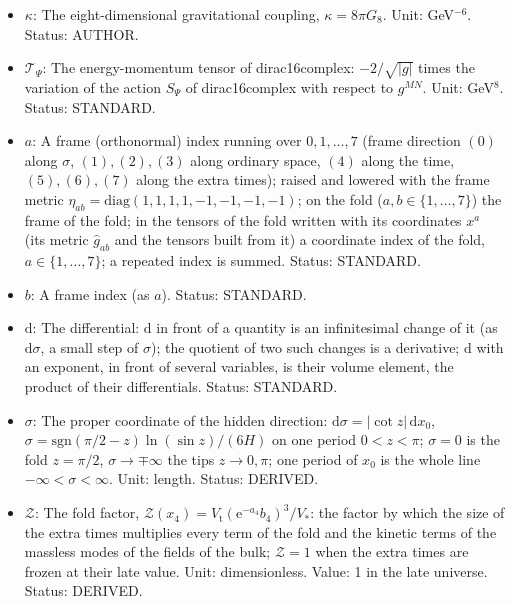 \documentclass[
  10pt,
]{article}
\providecommand{\tightlist}{%
  \setlength{\itemsep}{0pt}\setlength{\parskip}{0pt}}
\begin{document}
\begin{itemize}
\tightlist
\item
  \(\kappa\): The eight-dimensional gravitational coupling,
  \(\kappa = 8\pi G_8\). Unit: GeV\(^{-6}\). Status: AUTHOR.
\item
  \(\mathcal{T}_\Psi\): The energy-momentum tensor of dirac16complex:
  \(-2/\sqrt{\lvert g\rvert}\) times the variation of the action
  \(S_\Psi\) of dirac16complex with respect to \(g^{MN}\). Unit:
  GeV\(^8\). Status: STANDARD.
\item
  \(a\): A frame (orthonormal) index running over \(0, 1, \dots, 7\)
  (frame direction \((0)\) along \(\sigma\), \((1), (2), (3)\) along
  ordinary space, \((4)\) along the time, \((5), (6), (7)\) along the
  extra times); raised and lowered with the frame metric
  \(\eta_{ab} = \mathrm{diag}(1, 1, 1, 1, -1, -1, -1, -1)\); on the fold
  (\(a, b \in \{1, \dots, 7\}\)) the frame of the fold; in the tensors
  of the fold written with its coordinates \(x^a\) (its metric
  \(\hat g_{ab}\) and the tensors built from it) a coordinate index of
  the fold, \(a \in \{1, \dots, 7\}\); a repeated index is summed.
  Status: STANDARD.
\item
  \(b\): A frame index (as \(a\)). Status: STANDARD.
\item
  \(\mathrm{d}\): The differential: \(\mathrm{d}\) in front of a
  quantity is an infinitesimal change of it (as \(\mathrm{d}\sigma\), a
  small step of \(\sigma\)); the quotient of two such changes is a
  derivative; \(\mathrm{d}\) with an exponent, in front of several
  variables, is their volume element, the product of their
  differentials. Status: STANDARD.
\item
  \(\sigma\): The proper coordinate of the hidden direction:
  \(\mathrm{d}\sigma = \lvert\cot z\rvert\,\mathrm{d}x_0\),
  \(\sigma = \mathrm{sgn}(\pi/2 - z)\ln(\sin z)/(6H)\) on one period
  \(0 < z < \pi\); \(\sigma = 0\) is the fold \(z = \pi/2\),
  \(\sigma \to \mp\infty\) the tips \(z \to 0, \pi\); one period of
  \(x_0\) is the whole line \(-\infty < \sigma < \infty\). Unit: length.
  Status: DERIVED.
\item
  \(\mathcal{Z}\): The fold factor,
  \(\mathcal{Z}(x_4) = V_{\mathrm{t}}(\mathrm{e}^{-a_4}b_4)^3/V_*\): the
  factor by which the size of the extra times multiplies every term of
  the fold and the kinetic terms of the massless modes of the fields of
  the bulk; \(\mathcal{Z} = 1\) when the extra times are frozen at their
  late value. Unit: dimensionless. Value: 1 in the late universe.
  Status: DERIVED.

\end{itemize}
\end{document}
